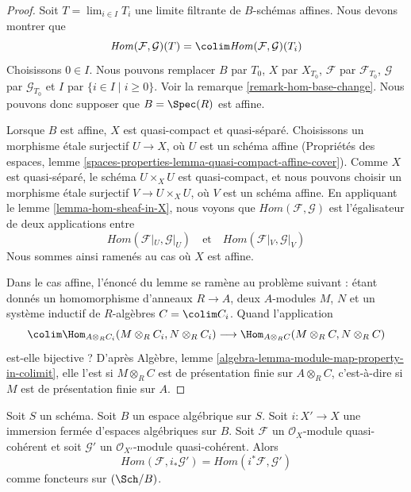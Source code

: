 \begin{proof}
Soit $T = \lim_{i \in I} T_i$ une limite filtrante de $B$-schémas affines.
Nous devons montrer que
$$
\mathit{Hom}(\mathcal{F}, \mathcal{G})(T) =
\colim \mathit{Hom}(\mathcal{F}, \mathcal{G})(T_i)
$$
Choisissons $0 \in I$. Nous pouvons remplacer $B$ par $T_0$, $X$ par
$X_{T_0}$, $\mathcal{F}$ par $\mathcal{F}_{T_0}$, $\mathcal{G}$ par
$\mathcal{G}_{T_0}$ et $I$ par $\{i \in I \mid i \geq 0\}$. Voir la
remarque \ref{remark-hom-base-change}. Nous pouvons donc supposer que
$B = \Spec(R)$ est affine.

\medskip\noindent
Lorsque $B$ est affine, $X$ est quasi-compact et quasi-séparé. Choisissons un
morphisme étale surjectif $U \to X$, où $U$ est un schéma affine (Propriétés
des espaces, lemme
\ref{spaces-properties-lemma-quasi-compact-affine-cover}). Comme $X$ est
quasi-séparé, le schéma $U \times_X U$ est quasi-compact, et nous pouvons
choisir un morphisme étale surjectif $V \to U \times_X U$, où $V$ est un
schéma affine. En appliquant le lemme \ref{lemma-hom-sheaf-in-X}, nous voyons
que $\mathit{Hom}(\mathcal{F}, \mathcal{G})$ est l'égalisateur de deux
applications entre
$$
\mathit{Hom}(\mathcal{F}|_U, \mathcal{G}|_U)
\quad\text{et}\quad
\mathit{Hom}(\mathcal{F}|_V, \mathcal{G}|_V)
$$
Nous sommes ainsi ramenés au cas où $X$ est affine.

\medskip\noindent
Dans le cas affine, l'énoncé du lemme se ramène au problème suivant : étant
donnés un homomorphisme d'anneaux $R \to A$, deux $A$-modules $M$, $N$ et un
système inductif de $R$-algèbres $C = \colim C_i$. Quand l'application
$$
\colim \Hom_{A \otimes_R C_i}(M \otimes_R C_i, N \otimes_R C_i)
\longrightarrow
\Hom_{A \otimes_R C}(M \otimes_R C, N \otimes_R C)
$$
est-elle bijective ? D'après Algèbre, lemme
\ref{algebra-lemma-module-map-property-in-colimit}, elle l'est si
$M \otimes_R C$ est de présentation finie sur $A \otimes_R C$, c'est-à-dire
si $M$ est de présentation finie sur $A$.
\end{proof}

\begin{lemma}
\label{lemma-hom-closed}
Soit $S$ un schéma. Soit $B$ un espace algébrique sur $S$. Soit
$i : X' \to X$ une immersion fermée d'espaces algébriques sur $B$. Soit
$\mathcal{F}$ un $\mathcal{O}_X$-module quasi-cohérent et soit
$\mathcal{G}'$ un $\mathcal{O}_{X'}$-module quasi-cohérent. Alors
$$
\mathit{Hom}(\mathcal{F}, i_*\mathcal{G}') =
\mathit{Hom}(i^*\mathcal{F}, \mathcal{G}')
$$
comme foncteurs sur $(\Sch/B)$.
\end{lemma}

